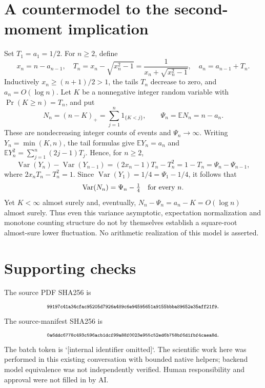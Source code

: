\documentclass[10pt]{article}
\begin{document}
\section*{A countermodel to the second-moment implication}
Set \(T_1=a_1=1/2\). For \(n\geq2\), define \[x_n=n-a_{n-1},\quad
 T_n=x_n-\sqrt{x_n^2-1}
     =\frac1{x_n+\sqrt{x_n^2-1}},\quad
 a_n=a_{n-1}+T_n.\] Inductively \(x_n\geq(n+1)/2>1\), the tails \(T_n\) decrease to zero, and \(a_n=O(\log n)\). Let \(K\) be a nonnegative integer random variable with \(\Pr(K\geq n)=T_n\), and put \[N_n=(n-K)_+=\sum_{j=1}^n1_{\{K<j\}},\qquad
 \Psi_n=\mathbb EN_n=n-a_n.\] These are nondecreasing integer counts of events and \(\Psi_n\to\infty\). Writing \(Y_n=\min(K,n)\), the tail formulas give \(\mathbb EY_n=a_n\) and \(\mathbb EY_n^2=\sum_{j=1}^n(2j-1)T_j\). Hence, for \(n\geq2\), \[\operatorname{Var}(Y_n)-\operatorname{Var}(Y_{n-1})
 =(2x_n-1)T_n-T_n^2=1-T_n
 =\Psi_n-\Psi_{n-1},\] where \(2x_nT_n-T_n^2=1\). Since \(\operatorname{Var}(Y_1)=1/4=\Psi_1-1/4\), it follows that \[\operatorname{Var}(N_n)=\Psi_n-\tfrac14
 \quad\hbox{for every }n.\] Yet \(K<\infty\) almost surely and, eventually, \(N_n-\Psi_n=a_n-K=O(\log n)\) almost surely. Thus even this variance asymptotic, expectation normalization and monotone counting structure do not by themselves establish a square-root almost-sure lower fluctuation. No arithmetic realization of this model is asserted.\par
\section*{Supporting checks}
The source PDF SHA256 is \[\text{\scriptsize\texttt{99197c41a34cfac95205d7926a489c6e94595651a9155bbba89652e35aff21f9}}.\] The source-manifest SHA256 is \[\text{\scriptsize\texttt{0a6ddc6778c493c596acb1dcf99a88f0023e955c52ed6b758bf6d1fbf4caea8d}}.\] The batch token is `[internal identifier omitted]`. The scientific work here was performed in this existing conversation with bounded native helpers; backend model equivalence was not independently verified. Human responsibility and approval were not filled in by AI.\par
\end{document}
